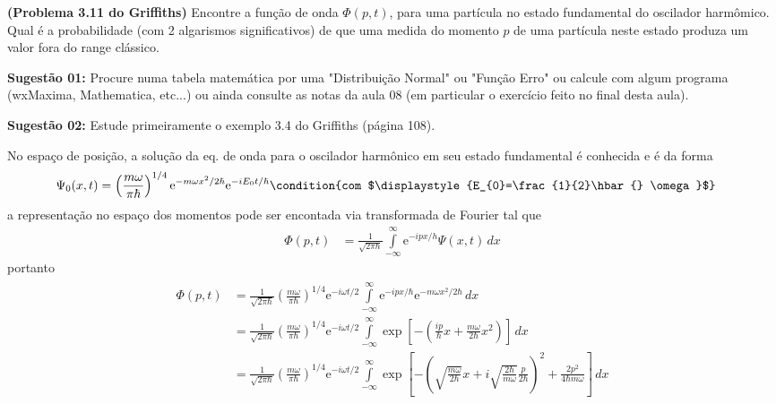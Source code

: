 	 \begin{prob}
		 \textbf{(Problema 3.11 do Griffiths)} Encontre a função de onda $\Phi(p,t)$, para uma partícula no estado fundamental  do oscilador harmômico. Qual é a probabilidade (com 2 algarismos significativos) de que uma medida do momento $p$ de uma partícula  neste estado produza um valor fora do range clássico.
		 \par\noindent\textbf{Sugestão 01:} Procure numa tabela matemática por uma "Distribuição Normal" ou "Função Erro" ou calcule com algum programa (wxMaxima, Mathematica, etc...) ou ainda consulte as notas da aula 08 (em particular o exercício feito no final desta aula).
		 \par\noindent\textbf{Sugestão 02:} Estude primeiramente o exemplo 3.4 do Griffiths (página 108).
		 \begin{sol}
			 No espaço de posição, a solução da eq. de onda para o oscilador harmônico em seu estado fundamental é conhecida e é da forma
			 \begin{align}
				 \Psi_{0}(x,t) &= \left(\frac{m\omega}{\pi \hbar{}}\right)^{1/4}\mathrm{e}^{-m \omega x^{2}/2\hbar{}}\mathrm{e}^{-iE_{0} t/\hbar{}}\condition{com $\displaystyle{E_{0}=\frac{1}{2}\hbar{} \omega}$}
			 \end{align}
			  a representação no espaço dos momentos pode ser encontada via transformada de Fourier tal que
				\begin{align}
					\Phi(p,t) &= \frac{1}{\sqrt{2 \pi \hbar{}}}\int\limits_{-\infty}^{\infty}\mathrm{e}^{-ipx/h} \Psi(x,t)\,d{x}	
				\end{align}
				portanto
				\begin{align}
						\begin{split}
							\Phi(p,t) &= \frac{1}{\sqrt{2 \pi \hbar}}\left(\frac{m \omega}{\pi \hbar}\right)^{1/4}\mathrm{e}^{-i \omega t/2}\int\limits_{-\infty}^{\infty}\mathrm{e}^{-ipx/\hbar}\mathrm{e}^{-m \omega x^{2}/2\hbar}\,d{x}\\
												&= \frac{1}{\sqrt{2 \pi \hbar}} \left(\frac{m \omega}{\pi \hbar}\right)^{1/4} \mathrm{e}^{-i \omega t/2}\int\limits_{-\infty}^{\infty}\exp\left[-\left(\frac{ip}{\hbar}x+\frac{m \omega}{2\hbar}x^{2}\right)\right]\,d{x}\\
												&= \frac{1}{\sqrt{2 \pi \hbar}}\left(\frac{m \omega}{\pi \hbar}\right)^{1/4}\mathrm{e}^{-i \omega t/2}\int\limits_{-\infty}^{\infty}\exp\left[-\left(\sqrt{\frac{m \omega}{2 \hbar}}x+i\sqrt{\frac{2 \hbar}{m \omega}}\frac{p}{2 \hbar}\right)^{2}+\frac{2p^{2}}{4\hbar m \omega}\right]\,d{x}\\

\end{split}
\end{align}
\end{sol}
\end{prob}
